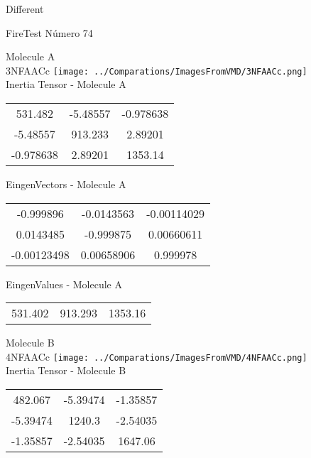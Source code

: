 \begin{center}
\vtab
\vtab
\textcolor{NavyBlue}{\Large Different}
\end{center}

 \newpage

\vtab[-2cm]
\begin{center}
{\large FireTest \tab Número 74}
\end{center}
\begin{multicols}{2}
\begin{center}

Molecule A \\ 
3NFAACc
\texttt{[image: ../Comparations/ImagesFromVMD/3NFAACc.png]}
\\
Inertia Tensor - Molecule A \\
\vtab

\begin{tabular}{|c c c|}
531.482	 & 	-5.48557	 & 	-0.978638	 \\
-5.48557	 & 	913.233	 & 	2.89201	 \\
-0.978638	 & 	2.89201	 & 	1353.14
\end{tabular}

\vtab
 EingenVectors - Molecule A     \\
\vtab
\begin{tabular}{|c c c|}
-0.999896	 & 	-0.0143563	 & 	-0.00114029	 \\
0.0143485	 & 	-0.999875	 & 	0.00660611	 \\
-0.00123498	 & 	0.00658906	 & 	0.999978
\end{tabular}

\vtab
 EingenValues - Molecule A     \\
\vtab
\begin{tabular}{|c c c|}
531.402	 & 	913.293	 & 	1353.16	 \\
\end{tabular}
\columnbreak

Molecule B \\ 
4NFAACc
\texttt{[image: ../Comparations/ImagesFromVMD/4NFAACc.png]}
\\
Inertia Tensor - Molecule B \\
\vtab

\begin{tabular}{|c c c|}
482.067	 & 	-5.39474	 & 	-1.35857	 \\
-5.39474	 & 	1240.3	 & 	-2.54035	 \\
-1.35857	 & 	-2.54035	 & 	1647.06
\end{tabular}


\end{center}
\end{multicols}
